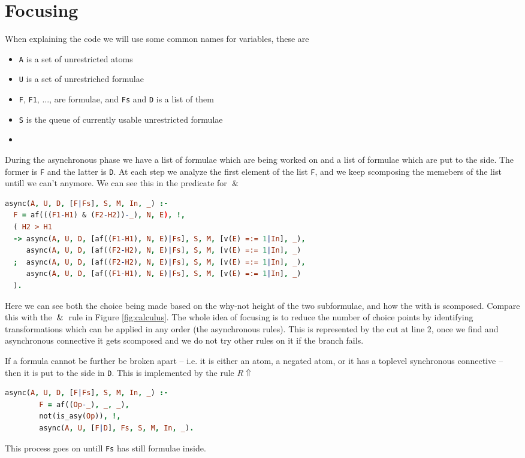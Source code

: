 \documentclass[a4paper, 12pt, tesi, english]{report}
\begin{document}
\section{Focusing}
When explaining the code we will use some common names for variables, these are
\begin{itemize}
	\item \texttt{A} is a set of unrestricted atoms
	\item \texttt{U} is a set of unrestriched formulae
	\item \texttt{F}, \texttt{F1}, ..., are formulae, and \texttt{Fs} and \texttt{D} is a list of them
	\item \texttt{S} is the queue of currently usable unrestricted formulae
	\item 
\end{itemize}
During the asynchronous phase we have a list of formulae which are being worked on and a list of formulae which are put to the side.
The former is \texttt{F} and the latter is \texttt{D}.
At each step we analyze the first element of the list \texttt{F}, and we keep scomposing the memebers of the list untill we can't anymore.
We can see this in the predicate for $\:\&\:$
\begin{lstlisting}[language=prolog]
async(A, U, D, [F|Fs], S, M, In, _) :-
  F = af(((F1-H1) & (F2-H2))-_), N, E), !,
  ( H2 > H1	
  -> async(A, U, D, [af((F1-H1), N, E)|Fs], S, M, [v(E) =:= 1|In], _), 
     async(A, U, D, [af((F2-H2), N, E)|Fs], S, M, [v(E) =:= 1|In], _) 
  ;  async(A, U, D, [af((F2-H2), N, E)|Fs], S, M, [v(E) =:= 1|In], _),
     async(A, U, D, [af((F1-H1), N, E)|Fs], S, M, [v(E) =:= 1|In], _)
  ).
\end{lstlisting}
Here we can see both the choice being made based on the why-not height of the two subformulae, and how the with is scomposed.
Compare this with the $\:\&\:$ rule in Figure \ref{fig:calculus}.
The whole idea of focusing is to reduce the number of choice points by identifying transformations which can be applied in any order (the asynchronous rules).
This is represented by the cut at line 2, once we find and asynchronous connective it gets scomposed and we do not try other rules on it if the branch fails.

If a formula cannot be further be broken apart -- i.e. it is either an atom, a negated atom, or it has a toplevel synchronous connective -- then it is put to the side in \texttt{D}.
This is implemented by the rule $R\!\Uparrow$
\begin{lstlisting}[language=prolog]
async(A, U, D, [F|Fs], S, M, In, _) :-
        F = af((Op-_), _, _),
        not(is_asy(Op)), !,
        async(A, U, [F|D], Fs, S, M, In, _).
\end{lstlisting}
This process goes on untill \texttt{Fs} has still formulae inside.
\end{document}
